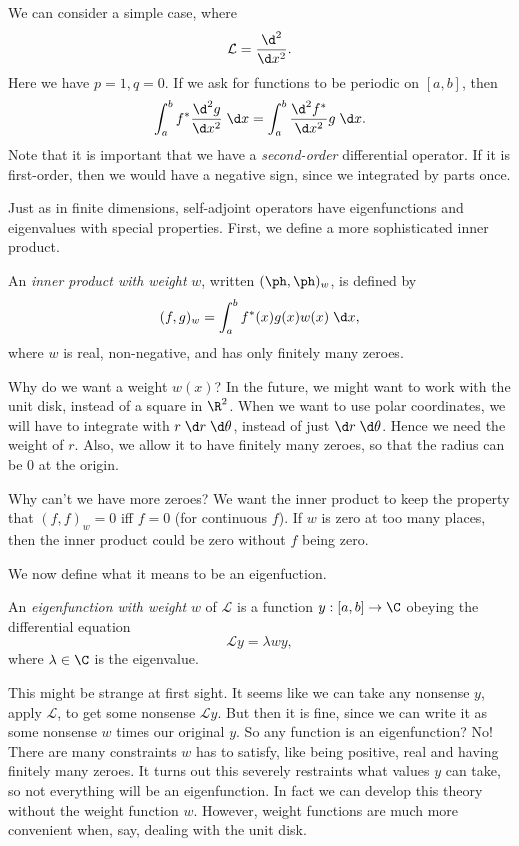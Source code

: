 \documentclass[a4paper]{article}
\begin{document}
\begin{eg}
  We can consider a simple case, where
  \[
    \mathcal{L} = \frac{\d^2}{\d x^2}.
  \]
  Here we have $p = 1, q = 0$. If we ask for functions to be periodic on $[a, b]$, then
  \[
    \int_a^b f^*\frac{\d^2 g}{\d x^2}\;\d x = \int_a^b \frac{\d^2 f^*}{\d x^2}g\;\d x.
  \]
  Note that it is important that we have a \emph{second-order} differential operator. If it is first-order, then we would have a negative sign, since we integrated by parts once.
\end{eg}

Just as in finite dimensions, self-adjoint operators have eigenfunctions and eigenvalues with special properties. First, we define a more sophisticated inner product.
\begin{defi}
  An \emph{inner product with weight} $w$, written $(\ph, \ph)_w$, is defined by
  \[
    (f, g)_w = \int_a^b f^*(x) g(x) w(x)\;\d x,
  \]
  where $w$ is real, non-negative, and has only finitely many zeroes.
\end{defi}
Why do we want a weight $w(x)$? In the future, we might want to work with the unit disk, instead of a square in $\R^2$. When we want to use polar coordinates, we will have to integrate with $r\;\d r\;\d \theta$, instead of just $\d r\;\d \theta$. Hence we need the weight of $r$. Also, we allow it to have finitely many zeroes, so that the radius can be $0$ at the origin.

Why can't we have more zeroes? We want the inner product to keep the property that $(f, f)_w = 0$ iff $f = 0$ (for continuous $f$). If $w$ is zero at too many places, then the inner product could be zero without $f$ being zero.

We now define what it means to be an eigenfuction.
\begin{defi}
  An \emph{eigenfunction with weight} $w$ of $\mathcal{L}$ is a function $y: [a, b] \to \C$ obeying the differential equation
  \[
    \mathcal{L} y = \lambda w y,
  \]
  where $\lambda\in \C$ is the eigenvalue.
\end{defi}
This might be strange at first sight. It seems like we can take any nonsense $y$, apply $\mathcal{L}$, to get some nonsense $\mathcal{L} y$. But then it is fine, since we can write it as some nonsense $w$ times our original $y$. So any function is an eigenfunction? No! There are many constraints $w$ has to satisfy, like being positive, real and having finitely many zeroes. It turns out this severely restraints what values $y$ can take, so not everything will be an eigenfunction. In fact we can develop this theory without the weight function $w$. However, weight functions are much more convenient when, say, dealing with the unit disk.
\end{document}
